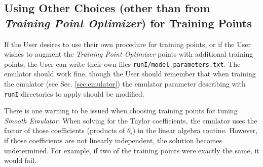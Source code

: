 \documentclass[UserManual.tex]{subfiles}
\begin{document}
\subsection{Using Other Choices (other than from {\it Training Point Optimizer}) for Training Points}

If the User desires to use their own procedure for training points, or if the User wishes to augment the {\it Training Point Optimizer} points with additional training points, the User can write their own files {\tt runI/model\_parameters.txt}. The emulator should work fine, though the User should remember that when training the emulator (see Sec. \ref{sec:emulator}) the emulator parameter describing with {\tt runI} directories to apply should be modified.

There is one warning to be issued when choosing training points for tuning {\it Smooth Emulator}. When solving for the Taylor coefficients, the emulator uses the factor of those coefficients (products of $\theta_i$) in the linear algebra routine. However, if those coefficients are not linearly independent, the solution becomes undetermined. For example, if two of the training points were exactly the same, it would fail. 
\end{document}
